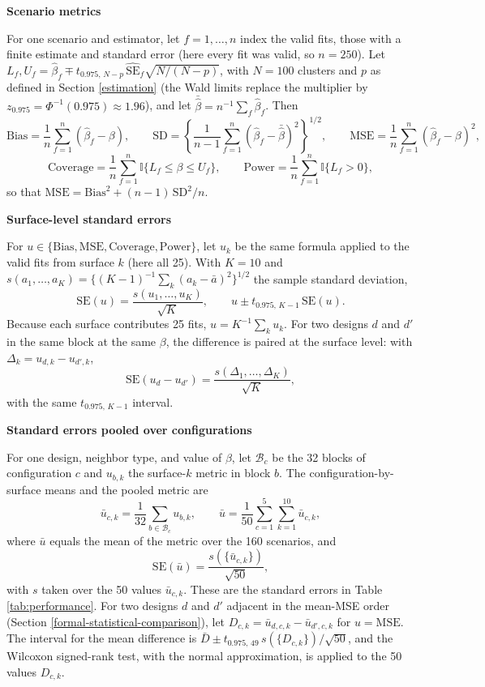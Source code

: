 \documentclass[11pt]{article}
\newcommand{\sihead}[1]{\par\medskip\noindent\textbf{#1}\par\nopagebreak\noindent\ignorespaces}
\begin{document}
\sihead{Scenario metrics}
For one scenario and estimator, let
\(f = 1, \dots, n\) index the valid fits, those with a finite estimate
and standard error (here every fit was valid, so \(n = 250\)). Let
\(L_f, U_f = \hat\beta_f \mp t_{0.975,\,N-p}\,\widehat{\text{SE}}_f\sqrt{N/(N-p)}\), with \(N = 100\) clusters and \(p\) as defined in Section \ref{estimation} (the Wald limits replace the multiplier by \(z_{0.975} = \Phi^{-1}(0.975) \approx 1.96\)), and let
\(\bar{\hat\beta} = n^{-1}\sum_f \hat\beta_f\). Then \[
\text{Bias} = \frac{1}{n}\sum_{f=1}^{n}(\hat\beta_f - \beta), \qquad
\text{SD} = \left\{\frac{1}{n-1}\sum_{f=1}^{n}\left(\hat\beta_f - \bar{\hat\beta}\right)^2\right\}^{1/2}, \qquad
\text{MSE} = \frac{1}{n}\sum_{f=1}^{n}(\hat\beta_f - \beta)^2,
\] \[
\text{Coverage} = \frac{1}{n}\sum_{f=1}^{n}\mathbb{I}\{L_f \le \beta \le U_f\}, \qquad
\text{Power} = \frac{1}{n}\sum_{f=1}^{n}\mathbb{I}\{L_f > 0\},
\] so that \(\text{MSE} = \text{Bias}^2 + (n-1)\,\text{SD}^2/n\).

\sihead{Surface-level standard errors}
For
\(u \in \{\text{Bias}, \text{MSE}, \text{Coverage}, \text{Power}\}\),
let \(u_k\) be the same formula applied to the valid fits from surface
\(k\) (here all 25). With \(K = 10\) and
\(s(a_1, \dots, a_K) = \{(K-1)^{-1}\sum_k (a_k - \bar a)^2\}^{1/2}\) the
sample standard deviation, \[
\text{SE}(u) = \frac{s(u_1, \dots, u_K)}{\sqrt{K}}, \qquad u \pm t_{0.975,\,K-1}\,\text{SE}(u).
\] Because each surface contributes 25 fits,
\(u = K^{-1}\sum_k u_k\). For two designs \(d\) and \(d'\) in the same
block at the same \(\beta\), the difference is paired at the surface
level: with \(\Delta_k = u_{d,k} - u_{d',k}\), \[
\text{SE}(u_d - u_{d'}) = \frac{s(\Delta_1, \dots, \Delta_K)}{\sqrt{K}},
\] with the same \(t_{0.975,\,K-1}\) interval.

\sihead{Standard errors pooled over configurations}
For one design,
neighbor type, and value of \(\beta\), let \(\mathcal{B}_c\) be the 32
blocks of configuration \(c\) and \(u_{b,k}\) the surface-\(k\) metric
in block \(b\). The configuration-by-surface means and the pooled metric
are \[
\bar u_{c,k} = \frac{1}{32}\sum_{b \in \mathcal{B}_c} u_{b,k}, \qquad
\bar u = \frac{1}{50}\sum_{c=1}^{5}\sum_{k=1}^{10}\bar u_{c,k},
\] where \(\bar u\) equals the mean of the metric over the 160
scenarios, and \[
\text{SE}(\bar u) = \frac{s(\{\bar u_{c,k}\})}{\sqrt{50}},
\] with \(s\) taken over the 50 values \(\bar u_{c,k}\). These are the
standard errors in Table \ref{tab:performance}. For two designs \(d\)
and \(d'\) adjacent in the mean-MSE order (Section \ref{formal-statistical-comparison}), let \(D_{c,k} = \bar u_{d,c,k} - \bar u_{d',c,k}\) for
\(u = \text{MSE}\). The interval for the mean difference is
\(\bar D \pm t_{0.975,\,49}\, s(\{D_{c,k}\})/\sqrt{50}\), and the
Wilcoxon signed-rank test, with the normal approximation, is applied to
the 50 values \(D_{c,k}\).
\fi
\end{document}

